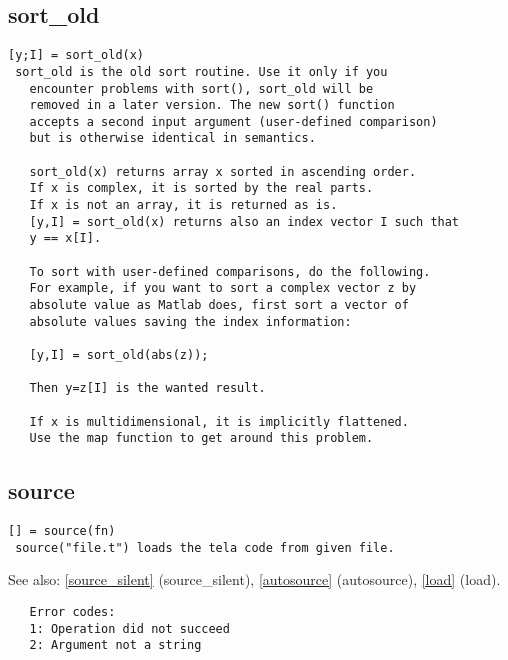 \documentclass[a4paper]{article}
\begin{document}
\subsection{sort\_old\label{sort_old}}

\begin{tscreen}
\begin{verbatim}
[y;I] = sort_old(x)
 sort_old is the old sort routine. Use it only if you
   encounter problems with sort(), sort_old will be
   removed in a later version. The new sort() function
   accepts a second input argument (user-defined comparison)
   but is otherwise identical in semantics.
   
   sort_old(x) returns array x sorted in ascending order.
   If x is complex, it is sorted by the real parts.
   If x is not an array, it is returned as is.
   [y,I] = sort_old(x) returns also an index vector I such that
   y == x[I].

   To sort with user-defined comparisons, do the following.
   For example, if you want to sort a complex vector z by
   absolute value as Matlab does, first sort a vector of
   absolute values saving the index information:

   [y,I] = sort_old(abs(z));

   Then y=z[I] is the wanted result.

   If x is multidimensional, it is implicitly flattened.
   Use the map function to get around this problem.
\end{verbatim}
\end{tscreen}



\subsection{source\label{source}}

\begin{tscreen}
\begin{verbatim}
[] = source(fn)
 source("file.t") loads the tela code from given file.
\end{verbatim}

See also: \ref{source_silent} {(source\_silent)}, \ref{autosource} {(autosource)}, \ref{load} {(load)}.
\begin{verbatim}
   Error codes:
   1: Operation did not succeed
   2: Argument not a string 
\end{verbatim}
\end{tscreen}
\end{document}
